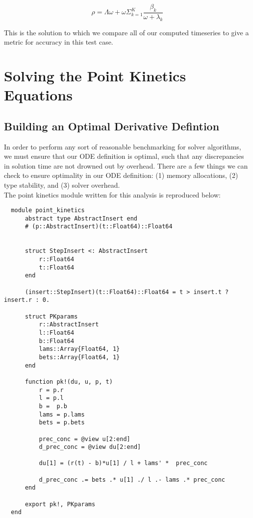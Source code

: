 \documentclass[review,onefignum,onetabnum]{siamart171218}
\begin{document}
\begin{equation}
  \rho = \Lambda\omega + \omega \Sigma_{k=1}^K \frac{\beta_k}{\omega + \lambda_k}
\end{equation}

This is the solution to which we compare all of our computed timeseries to give a
metric for accuracy in this test case.

\section{Solving the Point Kinetics Equations}

\subsection{Building an Optimal Derivative Defintion}
In order to perform any sort of reasonable benchmarking for solver algorithms,
we must ensure that our ODE definition is optimal, such that any discrepancies in
solution time are not drowned out by overhead. There are a few things we can check
to ensure optimality in our ODE definition: (1) memory allocations, (2) type stability,
and (3) solver overhead. \\

The point kinetics module written for this analysis is reproduced below:

\begin{lstlisting}
  module point_kinetics
      abstract type AbstractInsert end
      # (p::AbstractInsert)(t::Float64)::Float64


      struct StepInsert <: AbstractInsert
          r::Float64
          t::Float64
      end

      (insert::StepInsert)(t::Float64)::Float64 = t > insert.t ? insert.r : 0.

      struct PKparams
          r::AbstractInsert
          l::Float64
          b::Float64
          lams::Array{Float64, 1}
          bets::Array{Float64, 1}
      end

      function pk!(du, u, p, t)
          r = p.r
          l = p.l
          b =  p.b
          lams = p.lams
          bets = p.bets

          prec_conc = @view u[2:end]
          d_prec_conc = @view du[2:end]

          du[1] = (r(t) - b)*u[1] / l + lams' *  prec_conc

          d_prec_conc .= bets .* u[1] ./ l .- lams .* prec_conc
      end

      export pk!, PKparams
  end
\end{lstlisting}
\end{document}
